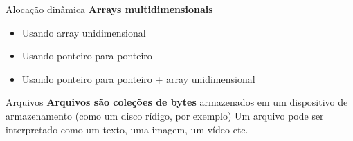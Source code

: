 \documentclass[10pt]{beamer}
\begin{document}
\begin{frame}[fragile]{Alocação dinâmica}
  \huge
  \textbf{Arrays multidimensionais}
  \vfill
  \LARGE
  \begin{itemize}
    \item Usando array unidimensional
    \item Usando ponteiro para ponteiro
    \item Usando ponteiro para ponteiro + array unidimensional
  \end{itemize}
\end{frame}

\begin{frame}{Arquivos}
  \LARGE
  \textbf{Arquivos são coleções de bytes} armazenados em um dispositivo de armazenamento (como um disco rídigo, por exemplo)
  \vfill
  Um arquivo pode ser interpretado como um texto, uma imagem, um vídeo etc.
\end{frame}
\end{document}
